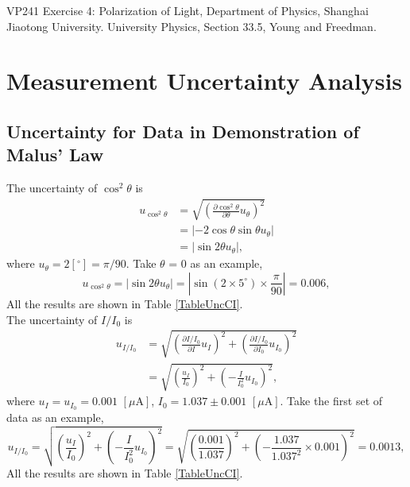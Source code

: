 \documentclass{article}
\begin{document}
\begin{thebibliography}{1}

 VP241 Exercise 4: Polarization of Light, Department of Physics, Shanghai Jiaotong University.
 University Physics, Section 33.5, Young and Freedman.

\end{thebibliography}

\newpage

\appendix

\section{Measurement Uncertainty Analysis}

\subsection{Uncertainty for Data in Demonstration of Malus' Law}

The uncertainty of $\cos^2\theta$ is 
\begin{align*}
u_{\cos^{2}\theta}&=\sqrt{(\frac{\partial \cos^{2}\theta}{\partial \theta}u_{\theta})^{2}}\\
&=|-2\cos\theta\sin\theta u_{\theta}|\\
&=|\sin2\theta u_{\theta}|,
\end{align*}
where $u_\theta = 2[^\circ] = \pi/90$. Take $\theta$ = 0 as an example, 
$$u_{\cos^{2}\theta}=|\sin2\theta u_{\theta}|=|\sin({2\times 5^\circ})\times \frac{\pi}{90}|=0.006,$$
All the results are shown in Table \ref{TableUncCI}.\\

The uncertainty of $I/I_0$ is 
\begin{align*}
u_{I/I_{0}}&=\sqrt{(\frac{\partial I/I_0}{\partial I}u_{I})^{2}+(\frac{\partial I/I_0}{\partial I_{0}}u_{I_{0}})^{2}}\\
&=\sqrt{(\frac{u_{I}}{I_{0}})^{2}+(-\frac{I}{I_{0}^{2}}u_{I_{0}})^{2}},
\end{align*}
where $u_I = u_{I_0} = 0.001\,\,[\mu\text{A}]$, $I_0 = 1.037 \pm 0.001\,\,[\mu\text{A}]$. Take the first set of data as an example,
$$u_{I/I_{0}}= \sqrt{(\frac{u_{I}}{I_{0}})^{2}+(-\frac{I}{I_{0}^{2}}u_{I_{0}})^{2}}=\sqrt{(\frac{0.001}{1.037})^{2}+(-\frac{1.037}{1.037^{2}}\times 0.001)^{2}}=0.0013,$$
All the results are shown in Table \ref{TableUncCI}.
\end{document}
